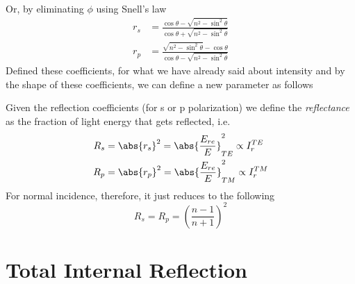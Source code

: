 \documentclass[../electromagnetism.tex]{subfiles}
\begin{document}
Or, by eliminating $\phi$ using Snell's law
\begin{equation}
	\begin{aligned}
		r_s&= \frac{\cos\theta-\sqrt{n^2-\sin^2\theta}}{\cos\theta+\sqrt{n^2-\sin^2\theta}}\\
		r_p&= \frac{\sqrt{n^2-\sin^2\theta}-\cos\theta}{\cos\theta-\sqrt{n^2-\sin^2\theta}}
	\end{aligned}
	\label{eq:fresneleq2}
\end{equation}
Defined these coefficients, for what we have already said about intensity and by the shape of these coefficients, we can define a new parameter as follows
\begin{dfn}[Reflectance]
	Given the reflection coefficients (for s or p polarization) we define the \emph{reflectance} as the fraction of light energy that gets reflected, i.e.
	\begin{equation}
		\begin{aligned}
			R_s&= \abs{r_s}^2=\abs{\frac{E_{re}}{E}}^2_{TE}\propto I_r^{TE}\\
			R_p&= \abs{r_p}^2=\abs{\frac{E_{re}}{E}}^2_{TM}\propto I_r^{TM}
		\end{aligned}
		\label{eq:reflectancedef}
	\end{equation}
	For normal incidence, therefore, it just reduces to the following
	\begin{equation}
		R_s=R_p=\left( \frac{n-1}{n+1} \right)^2
		\label{eq:normalincidencereflectance}
	\end{equation}
\end{dfn}
\section{Total Internal Reflection}
\end{document}

